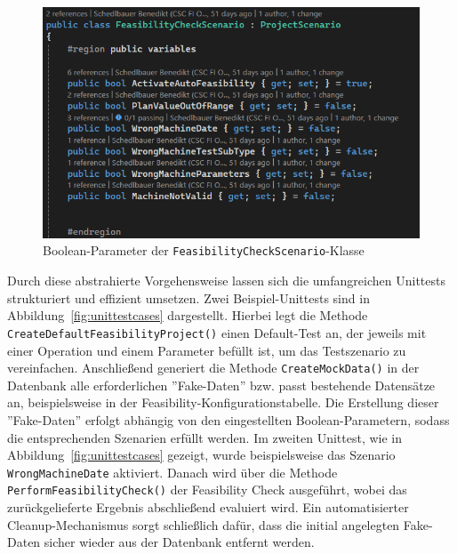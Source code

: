 \begin{figure}[!htb]
    \centering
    \includegraphics[width=1\textwidth]{bilder/unittests-parameters.png}
    \caption{Boolean-Parameter der \texttt{FeasibilityCheckScenario}-Klasse}
    \label{fig:unittests-parameters}
\end{figure}

Durch diese abstrahierte Vorgehensweise lassen sich die umfangreichen Unittests strukturiert und effizient umsetzen. Zwei Beispiel-Unittests sind in Abbildung~\ref{fig:unittestcases} dargestellt. Hierbei legt die Methode \texttt{CreateDefaultFeasibilityProject()} einen Default-Test an, der jeweils mit einer Operation und einem Parameter befüllt ist, um das Testszenario zu vereinfachen. Anschließend generiert die Methode \texttt{CreateMockData()} in der Datenbank alle erforderlichen ''Fake-Daten'' bzw. passt bestehende Datensätze an, beispielsweise in der Feasibility-Konfigurationstabelle. Die Erstellung dieser ''Fake-Daten'' erfolgt abhängig von den eingestellten Boolean-Parametern, sodass die entsprechenden Szenarien erfüllt werden. Im zweiten Unittest, wie in Abbildung~\ref{fig:unittestcases} gezeigt, wurde beispielsweise das Szenario \texttt{WrongMachineDate} aktiviert. Danach wird über die Methode \texttt{PerformFeasibilityCheck()} der Feasibility Check ausgeführt, wobei das zurückgelieferte Ergebnis abschließend evaluiert wird. Ein automatisierter Cleanup-Mechanismus sorgt schließlich dafür, dass die initial angelegten Fake-Daten sicher wieder aus der Datenbank entfernt werden.


